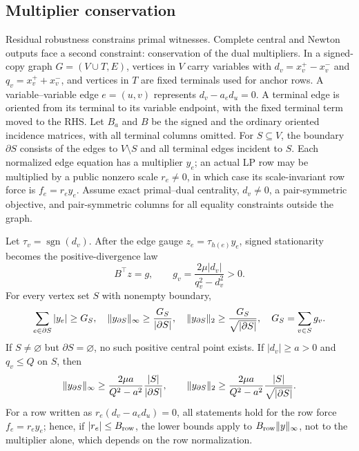 \subsection{Multiplier conservation}
\label{sec:frontier-multiplier}

Residual robustness constrains primal witnesses.  Complete central and
Newton outputs face a second constraint: conservation of the dual
multipliers.  In a signed-copy graph \(G=(V\cup T,E)\), vertices in \(V\) carry variables with
\(d_v=x_v^+-x_v^-\) and \(q_v=x_v^++x_v^-\), and vertices in \(T\) are fixed
terminals used for anchor rows.  A variable--variable edge \(e=(u,v)\)
represents \(d_v-a_ed_u=0\).  A terminal edge is oriented from its terminal
to its variable endpoint, with the fixed terminal term moved to the RHS.
Let \(B_a\) and \(B\) be the signed and the ordinary oriented incidence
matrices, with all terminal columns omitted.  For
\(S\subseteq V\), the boundary \(\partial S\) consists of the edges to
\(V\setminus S\) and all terminal edges incident to \(S\).  Each normalized
edge equation has a multiplier \(y_e\); an actual LP row may be multiplied
by a public nonzero scale \(r_e\ne0\), in which case its scale-invariant row
force is \(f_e=r_ey_e\).
Assume exact primal--dual centrality, \(d_v\ne0\), a pair-symmetric objective,
and pair-symmetric columns for all equality constraints outside the graph.

\begin{theorem}
\label{thm:frontier-gauge-flow}
Let \(\tau_v=\operatorname{sgn}(d_v)\).  After the edge gauge
\(z_e=\tau_{h(e)}y_e\), signed stationarity becomes the positive-divergence
law
\begin{equation}
 B^\top z=g,
 \qquad g_v=\frac{2\mu|d_v|}{q_v^2-d_v^2}>0.
 \label{eq:frontier-gauge-flow}
\end{equation}
For every vertex set \(S\) with nonempty boundary,
\begin{equation}
 \sum_{e\in\partial S}|y_e|\geq G_S,
 \quad
 \lVert y_{\partial S}\rVert_\infty\geq\frac{G_S}{|\partial S|},
 \quad
 \lVert y_{\partial S}\rVert_2\geq\frac{G_S}{\sqrt{|\partial S|}},
 \quad G_S=\sum_{v\in S}g_v.
 \label{eq:frontier-cut-flow}
\end{equation}
If \(S\ne\varnothing\) but \(\partial S=\varnothing\), no such positive
central point exists.
If \(|d_v|\geq a>0\) and \(q_v\leq Q\) on \(S\), then
\begin{equation}
 \lVert y_{\partial S}\rVert_\infty
 \geq\frac{2\mu a}{Q^2-a^2}\frac{|S|}{|\partial S|},
 \qquad
 \lVert y_{\partial S}\rVert_2
 \geq\frac{2\mu a}{Q^2-a^2}\frac{|S|}{\sqrt{|\partial S|}}.
 \label{eq:frontier-isoperimetric}
\end{equation}
For a row written as \(r_e(d_v-a_ed_u)=0\), all statements hold for the
row force \(f_e=r_ey_e\); hence, if \(|r_e|\leq B_{\rm row}\), the lower
bounds apply to \(B_{\rm row}\lVert y\rVert_\infty\), not to the multiplier
alone, which depends on the row normalization.
\end{theorem}

